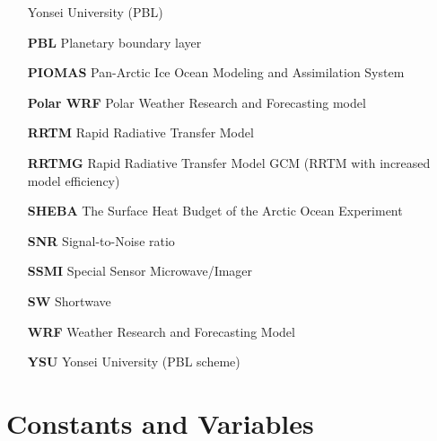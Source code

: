 \begin{enumerate}
    \hspace*{3.3cm} Yonsei University (PBL)
    \item[\textbf{PBL}] Planetary boundary layer
    \item[\textbf{PIOMAS}] Pan-Arctic Ice Ocean Modeling and Assimilation System
    \item[\textbf{Polar WRF}] Polar Weather Research and Forecasting model
    \item[\textbf{RRTM}] Rapid Radiative Transfer Model
    \item[\textbf{RRTMG}] Rapid Radiative Transfer Model GCM (RRTM with increased model efficiency)
    \item[\textbf{SHEBA}] The Surface Heat Budget of the Arctic Ocean Experiment
    \item[\textbf{SNR}] Signal-to-Noise ratio
    \item[\textbf{SSMI}] Special Sensor Microwave/Imager
    \item[\textbf{SW}] Shortwave
    \item[\textbf{WRF}] Weather Research and Forecasting Model
    \item[\textbf{YSU}] Yonsei University (PBL scheme)
\end{enumerate}
\section{Constants and Variables}
